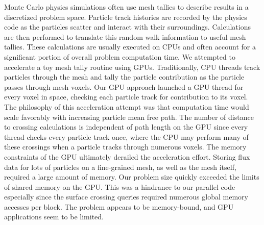 \abstract
Monte Carlo physics simulations often use mesh tallies to describe results in a
discretized problem space. Particle track histories are recorded by the physics
code as the particles scatter and interact with their surroundings. Calculations
are then performed to translate this random walk information to useful mesh
tallies. These calculations are usually executed on CPUs and often account for a
significant portion of overall problem computation time. We attempted to
accelerate a toy mesh tally routine using GPUs. Traditionally, CPU threads track
particles through the mesh and tally the particle contribution as the particle
passes through mesh voxels. Our GPU approach launched a GPU thread for every
voxel in space, checking each particle track for contribution to its voxel.
The philosophy of this acceleration attempt was that computation time would scale
favorably with increasing particle mean free path. The number of distance to crossing
calculations is independent of path length on the GPU since every thread checks
every particle track once, where the CPU may perform many of these crossings
when a particle tracks through numerous voxels. The memory constraints of the
GPU ultimately derailed the acceleration effort. Storing flux data for lots of
particles on a fine-grained mesh, as well as the mesh itself, required a large amount of memory. 
Our problem size quickly exceeded the limits of shared memory on the GPU. This was a
hindrance to our parallel code especially since the surface crossing queries
required numerous global memory accesses per block. The problem appears to be
memory-bound, and GPU applications seem to be limited.
